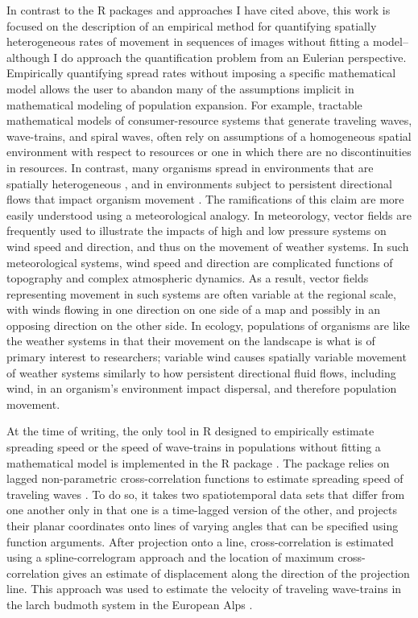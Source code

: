 In contrast to the R packages and approaches I have cited above, this
work is focused on the description of an empirical method for
quantifying spatially heterogeneous rates of movement in sequences of
images without fitting a model--although I do approach the
quantification problem from an Eulerian perspective. Empirically
quantifying spread rates without imposing a specific mathematical model
allows the user to abandon many of the assumptions implicit in
mathematical modeling of population expansion. For example, tractable
mathematical models of consumer-resource systems that generate traveling
waves, wave-trains, and spiral waves, often rely on assumptions of a
homogeneous spatial environment with respect to resources or one in
which there are no discontinuities in resources. In contrast, many
organisms spread in environments that are spatially heterogeneous
\citep{Urban2008}, and in environments subject to persistent directional
flows that impact organism movement \citep{Hoffman2006}. The
ramifications of this claim are more easily understood using a
meteorological analogy. In meteorology, vector fields are frequently
used to illustrate the impacts of high and low pressure systems on wind
speed and direction, and thus on the movement of weather systems. In
such meteorological systems, wind speed and direction are complicated
functions of topography and complex atmospheric dynamics. As a result,
vector fields representing movement in such systems are often variable
at the regional scale, with winds flowing in one direction on one side
of a map and possibly in an opposing direction on the other side. In
ecology, populations of organisms are like the weather systems in that
their movement on the landscape is what is of primary interest to
researchers; variable wind causes spatially variable movement of weather
systems similarly to how persistent directional fluid flows, including
wind, in an organism's environment impact dispersal, and therefore
population movement.

At the time of writing, the only tool in R \citep{R} designed to
empirically estimate spreading speed or the speed of wave-trains in
populations without fitting a mathematical model is implemented in the
 R package \citep{ncf}. The  package relies on
lagged non-parametric cross-correlation functions to estimate spreading
speed of traveling waves \citep{Bjornstad2001}. To do so, it takes two
spatiotemporal data sets that differ from one another only in that one
is a time-lagged version of the other, and projects their planar
coordinates onto lines of varying angles that can be specified using
function arguments. After projection onto a line, cross-correlation is
estimated using a spline-correlogram approach \citep{Bjornstad2001} and
the location of maximum cross-correlation gives an estimate of
displacement along the direction of the projection line. This approach
was used to estimate the velocity of traveling wave-trains in the larch
budmoth system in the European Alps \citep{Bjornstad2002}.

